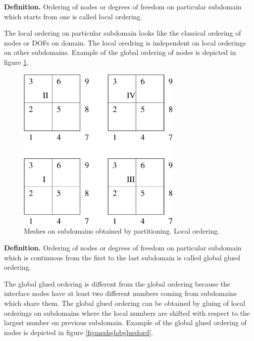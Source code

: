\noindent
{\bf Definition.}
Ordering of nodes or degrees of freedom on particular subdomain which starts from one is called
local  ordering.

\noindent
The local ordering on particular subdomain looks like the classical ordering of nodes or DOFs on domain.
The local oredring is independent on local orderings on other subdomains. 
Example of the global ordering of nodes is depicted in figure \ref{figmeshlocord}.

\begin{figure}[h]
\begin{center}
\includegraphics[width=80mm]{FIG/meshlocord.eps}
\caption{Meshes on subdomains obtained by partitioning. Local ordering.}
\label{figmeshlocord}
\end{center}
\end{figure}

\noindent
{\bf Definition.}
Ordering of nodes or degrees of freedom on particular subdomain which is continuous from the first
to the last subdomain is called
global  glued ordering.
\label{globgluedorder}

\noindent
The global glued ordering is different from the global ordering because the interface nodes
have at least two different numbers coming from subdomains which share them. The global glued
ordering can be obtained by gluing of local orderings on subdomains where the local numbers
are shifted with respect to the largest number on previous subdomain.
Example of the global glued ordering of nodes is depicted in figure \ref{figmeshglobgluedord}.


